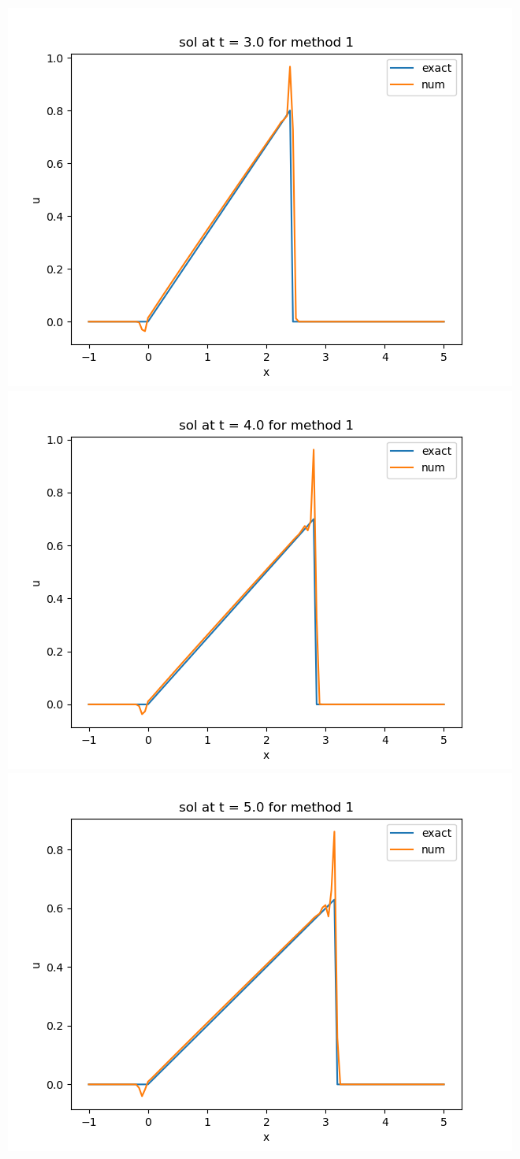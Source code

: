 \documentclass{article}
\begin{document}
\begin{center}
	\includegraphics[scale=.23]{hw13 sol t = 3 method 1}
	\includegraphics[scale=.3]{hw13 sol t = 4 method 1}
	\includegraphics[scale=.3]{hw13 sol t = 5 method 1}

\end{center}
\end{document}
